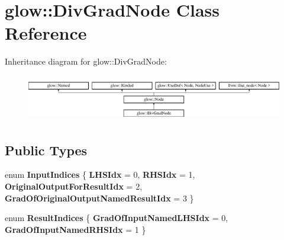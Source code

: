\hypertarget{classglow_1_1_div_grad_node}{}\section{glow\+:\+:Div\+Grad\+Node Class Reference}
\label{classglow_1_1_div_grad_node}
Inheritance diagram for glow\+:\+:Div\+Grad\+Node\+:\begin{figure}[H]
\begin{center}
\leavevmode
\includegraphics[height=2.028986cm]{classglow_1_1_div_grad_node}
\end{center}
\end{figure}
\subsection*{Public Types}
\begin{DoxyCompactItemize}
\item 
\mbox{\label{classglow_1_1_div_grad_node_ad22747e569eca6945331cb28acfe4ed9}} 
enum {\bfseries Input\+Indices} \{ {\bfseries L\+H\+S\+Idx} = 0, 
{\bfseries R\+H\+S\+Idx} = 1, 
{\bfseries Original\+Output\+For\+Result\+Idx} = 2, 
{\bfseries Grad\+Of\+Original\+Output\+Named\+Result\+Idx} = 3
 \}
\item 
\mbox{\label{classglow_1_1_div_grad_node_abc6632bc905f054aeebf679fae72afee}} 
enum {\bfseries Result\+Indices} \{ {\bfseries Grad\+Of\+Input\+Named\+L\+H\+S\+Idx} = 0, 
{\bfseries Grad\+Of\+Input\+Named\+R\+H\+S\+Idx} = 1
 \}
\end{DoxyCompactItemize}
